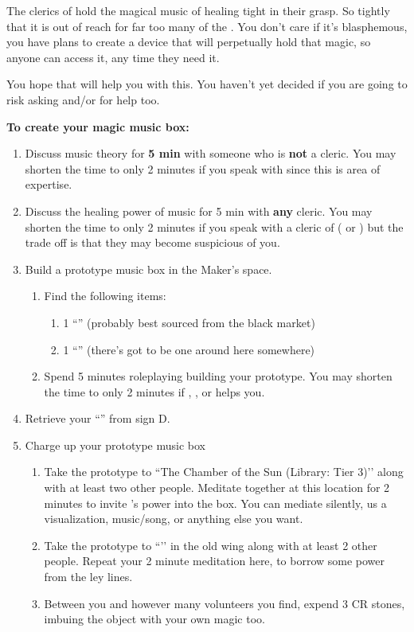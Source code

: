 \documentclass[green]{GL2020}
\begin{document}
\name{\gMusicBox{}}

The clerics of \cFarmGod{} hold the magical music of healing tight in their grasp. So tightly that it is out of reach for far too many of the \pFarmers{}. You don’t care if it’s blasphemous, you have plans to create a device that will perpetually hold that magic, so anyone can access it, any time they need it.

You hope that \cScholarship{\full} will help you with this. You haven’t yet decided if you are going to risk asking \cInterpol{\full} and/or \cMusic{\full} for help too.

\textbf{To create your magic music box:}
\begin{enumerate}
  \item Discuss music theory for \textbf{5 min} with someone who is \textbf{not} a cleric. You may shorten the time to only 2 minutes if you speak with \cMusic{\full} since this is \cMusic{\their} area of expertise.
  \item Discuss the healing power of music for 5 min with \textbf{any} cleric. You may shorten the time to only 2 minutes if you speak with a cleric of \cFarmGod{} (\cDisney{\full} or \cHedonist{\full}) but the trade off is that they may become suspicious of you.

  \item Build a prototype music box in the Maker’s space.
  \begin{enumerate}
    \item Find the following items:
    \begin{enumerate}
      \item 1 ``\iMagitechParts{}'' (probably best sourced from the black market)
      \item 1 ``\iWoodenBlock{}'' (there’s got to be one around here somewhere)
    \end{enumerate}
    \item Spend 5 minutes roleplaying building your prototype. You may shorten the time to only 2 minutes if \cChupInventor{\full}, \cPirate{\full}, \cBunker{\full} or \cTechStar{\full} helps you.
  \end{enumerate}
  \item Retrieve your ``\iProtypeMusicBox{}'' from sign D.

  \item Charge up your prototype music box
  \begin{enumerate}
	\item Take the prototype to ``The Chamber of the Sun (Library: Tier 3)’’ along with at least two other people. Meditate together at this location for 2 minutes to invite \cFarmGod{}’s power into the box. You can mediate silently, us a visualization, music/song, or anything else you want.
	\item Take the prototype to ``\sLeyLinesNexus{}’’ in the old wing along with at least 2 other people. Repeat your 2 minute meditation here, to borrow some power from the ley lines.
	\item Between you and however many volunteers you find, expend 3 CR stones, imbuing the object with your own magic too.
     \end{enumerate}


\end{enumerate}
\end{document}
